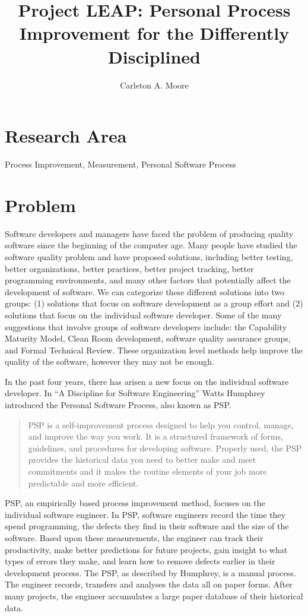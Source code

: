 \documentclass[12pt]{article}
\begin{document}
\title{Project LEAP: Personal Process Improvement for the Differently Disciplined}
\author{Carleton A. Moore}
\maketitle

\section*{Research Area}
Process Improvement, Measurement, Personal Software Process
\section*{Problem}

Software developers and managers have faced the problem of producing
quality software since the beginning of the computer age.  Many
people have studied the software quality problem and have proposed
solutions, including better testing, better organizations, better
practices, better project tracking, better programming environments, and
many other factors that potentially affect the development of software.  We
can categorize these different solutions into two groups: (1) solutions
that focus on software development as a group effort and (2) solutions that
focus on the individual software developer.  Some of the many suggestions
that involve groups of software developers include: the Capability Maturity
Model, Clean Room development, software quality assurance groups, and
Formal Technical Review.  These organization level methods help improve the
quality of the software, however they may not be enough.

In the past four years, there has arisen a new focus on the individual software
developer.  In ``A Discipline for Software Engineering''\cite{Humphrey95}
Watts Humphrey introduced the Personal Software Process, also known as PSP.
\begin{quote}
  PSP is a self-improvement process designed to help you control, manage,
  and improve the way you work.  It is a structured framework of forms,
  guidelines, and procedures for developing software.  Properly used, the
  PSP provides the historical data you need to better make and meet
  commitments and it makes the routine elements of your job more
  predictable and more efficient.\cite{Humphrey95}
\end{quote}
PSP, an empirically based process improvement method, focuses on the
individual software engineer.  In PSP, software engineers record the time
they spend programming, the defects they find in their software and the
size of the software.  Based upon these measurements, the engineer can track
their productivity, make better predictions for future projects, gain
insight to what types of errors they make, and learn how to remove defects
earlier in their development process.  The PSP, as described by Humphrey,
is a manual process.  The engineer records, transfers and analyses the data
all on paper forms.  After many projects, the engineer accumulates a large
paper database of their historical data.
\end{document}
